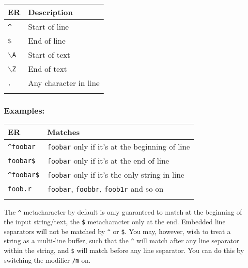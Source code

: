 \begin{footnotesize}
  \begin{tabularx}{\textwidth}{>{\hsize=0.3\hsize}X>{\hsize=0.7\hsize}X}\\
    \hline
    \textbf{ER} & \textbf{Description} \\
    \hline
    \texttt{\^{}} & Start of line \\
    \texttt{\$} & End of line \\
    \texttt{$\backslash$A} & Start of text \\
    \texttt{$\backslash$Z} & End of text \\
    \texttt{.} & Any character in line \\
    \hline
    \\
  \end{tabularx}
\end{footnotesize}


\subsubsection{Examples:}

\begin{footnotesize}
  \begin{tabularx}{\textwidth}{>{\hsize=0.3\hsize}X>{\hsize=0.7\hsize}X}\\
    \hline
    \textbf{ER} & \textbf{Matches} \\
    \hline
    \texttt{\^{}foobar} & \texttt{foobar} only if it's at the beginning of line \\
    \texttt{foobar\$} & \texttt{foobar} only if it's at the end of line \\
    \texttt{\^{}foobar\$} & \texttt{foobar} only if it's the only string in line \\
    \texttt{foob.r} & \texttt{foobar}, \texttt{foobbr}, \texttt{foob1r} and so on \\
    \hline
    \\
  \end{tabularx}
\end{footnotesize}

The \texttt{\^{}} metacharacter by default is only guaranteed to match at
the beginning of the input string/text, the \texttt{\$} metacharacter
only at the end. Embedded line separators will not be matched by
\texttt{\^{}} or \texttt{\$}. You may, however, wish to treat a string
as a multi-line buffer, such that the \texttt{\^{}} will match after
any line separator within the string, and \texttt{\$} will match before
any line separator. You can do this by switching the modifier \texttt{/m} on.

